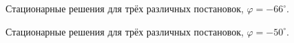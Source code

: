 \documentclass[14pt, a4paper, fleqn]{extarticle}
\begin{document}
\begin{figure}[H]
\caption{Стационарные решения для трёх различных постановок, $\varphi = -66^\circ$.}
\end{figure}

\begin{figure}[H]
\caption{Стационарные решения для трёх различных постановок, $\varphi = -50^\circ$.}
\end{figure}
\end{document}

